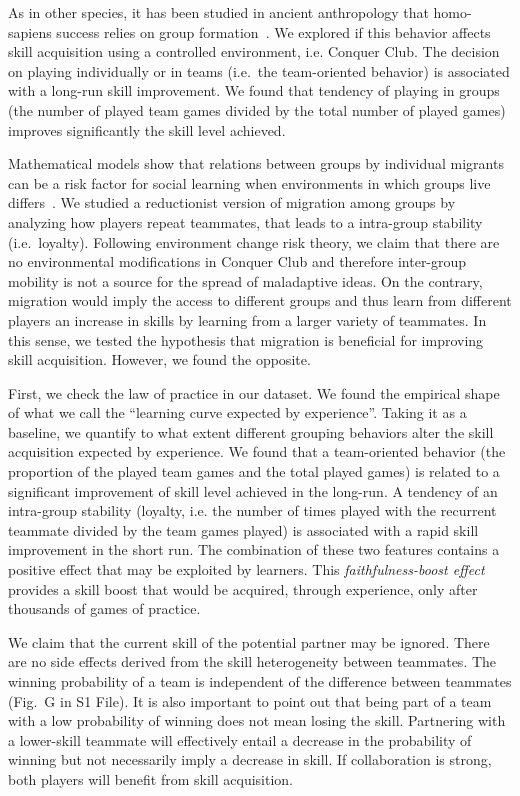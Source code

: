 \documentclass[a4paper,10pt]{book}
\theoremstyle{definition}
\begin{document}
As in other species, it has been studied in ancient anthropology that homo-sapiens success relies on group formation~\cite{richerson2010-geneCultureCoevolution,dunbar1993-coevolutionNeocorticalSizeGroupSizeAndLanguage}.
We explored if this behavior affects skill acquisition using a controlled environment, i.e. Conquer Club.
The decision on playing individually or in teams (i.e.~the team-oriented behavior) is associated with a long-run skill improvement.
We found that tendency of playing in groups (the number of played team games divided by the total number of played games) improves significantly the skill level achieved.

Mathematical models show that relations between groups by individual migrants can be a risk factor for social learning when environments in which groups live differs~\cite{boyd1989-socialLearningAsAdaptation}.
We studied a reductionist version of migration among groups by analyzing how players repeat teammates, that leads to a intra-group stability (i.e.~loyalty).
Following environment change risk theory, we claim that there are no environmental modifications in Conquer Club and therefore inter-group mobility is not a source for the spread of maladaptive ideas.
On the contrary, migration would imply the access to different groups and thus learn from different players an increase in skills by learning from a larger variety of teammates.
In this sense, we tested the hypothesis that migration is beneficial for improving skill acquisition.
However, we found the opposite. 

First, we check the law of practice in our dataset.
We found the empirical shape of what we call the ``learning curve expected by experience''.
Taking it as a baseline, we quantify to what extent different grouping behaviors alter the skill acquisition expected by experience.
We found that a team-oriented behavior (the proportion of the played team games and the total played games) is related to a significant improvement of skill level achieved in the long-run.
A tendency of an intra-group stability (loyalty, i.e. the number of times played with the recurrent teammate divided by the team games played) is associated with a rapid skill improvement in the short run.
The combination of these two features contains a positive effect that may be exploited by learners. 
This \emph{faithfulness-boost effect} provides a skill boost that would be acquired, through experience, only after thousands of games of practice.

We claim that the current skill of the potential partner may be ignored.
There are no side effects derived from the skill heterogeneity between teammates.
The winning probability of a team is independent of the difference between teammates (Fig.~G in S1 File).
It is also important to point out that being part of a team with a low probability of winning does not mean losing the skill.
Partnering with a lower-skill teammate will effectively entail a decrease in the probability of winning but not necessarily imply a decrease in skill.
If collaboration is strong, both players will benefit from skill acquisition.
\end{document}
